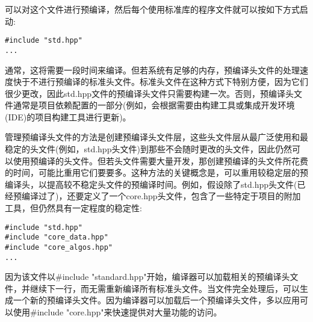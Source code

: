 可以对这个文件进行预编译，然后每个使用标准库的程序文件就可以按如下方式启动:

\begin{lstlisting}[style=styleCXX]
#include "std.hpp"
...
\end{lstlisting}

通常，这将需要一段时间来编译。但若系统有足够的内存，预编译头文件的处理速度快于不进行预编译的标准头文件。标准头文件在这种方式下特别方便，因为它们很少更改，因此std.hpp文件的预编译头文件只需要构建一次。否则，预编译头文件通常是项目依赖配置的一部分(例如，会根据需要由构建工具或集成开发环境(IDE)的项目构建工具进行更新)。

管理预编译头文件的方法是创建预编译头文件层，这些头文件层从最广泛使用和最稳定的头文件(例如，std.hpp头文件)到那些不会随时更改的头文件，因此仍然可以使用预编译的头文件。但若头文件需要大量开发，那创建预编译的头文件所花费的时间，可能比重用它们要要多。这种方法的关键概念是，可以重用较稳定层的预编译头，以提高较不稳定头文件的预编译时间。例如，假设除了std.hpp头文件(已经预编译过了)，还要定义了一个core.hpp头文件，包含了一些特定于项目的附加工具，但仍然具有一定程度的稳定性:

\begin{lstlisting}[style=styleCXX]
#include "std.hpp"
#include "core_data.hpp"
#include "core_algos.hpp"
...
\end{lstlisting}

因为该文件以\#include "standard.hpp"开始，编译器可以加载相关的预编译头文件，并继续下一行，而无需重新编译所有标准头文件。当文件完全处理后，可以生成一个新的预编译头文件。因为编译器可以加载后一个预编译头文件，多以应用可以使用\#include "core.hpp"来快速提供对大量功能的访问。























